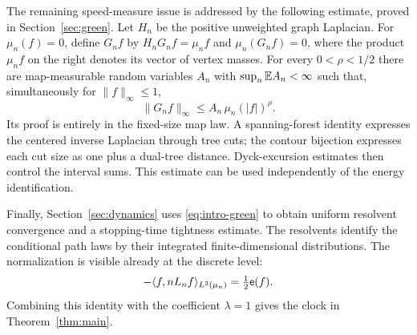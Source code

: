 The remaining speed-measure issue is addressed by the following estimate,
proved in Section~\ref{sec:green}. Let $H_n$ be the positive unweighted
graph Laplacian. For $\mu_n(f)=0$, define $G_nf$ by
$H_nG_nf=\mu_nf$ and $\mu_n(G_nf)=0$, where the product $\mu_nf$ on the
right denotes its vector of vertex masses. For every $0<\rho<1/2$ there
are map-measurable random variables $A_n$ with
$\sup_n\mathbb E A_n<\infty$ such that, simultaneously for $\|f\|_\infty\le1$,
\begin{equation}\label{eq:intro-green}
 \|G_nf\|_\infty\le A_n\,\mu_n(|f|)^\rho.
\end{equation}
Its proof is entirely in the fixed-size map law. A spanning-forest
identity expresses the centered inverse Laplacian through tree cuts;
the contour bijection expresses each cut size as one plus a dual-tree
distance. Dyck-excursion estimates then control the interval sums.
This estimate can be used independently of the energy identification.

Finally, Section~\ref{sec:dynamics} uses \eqref{eq:intro-green} to obtain
uniform resolvent convergence and a stopping-time tightness estimate.
The resolvents identify the conditional path laws by their integrated
finite-dimensional distributions. The normalization is visible already
at the discrete level:
\[
 -\langle f,nL_nf\rangle_{L^2(\mu_n)}=\tfrac12\mathsf e(f).
\]
Combining this identity with the coefficient $\lambda=1$ gives the clock
in Theorem~\ref{thm:main}.

